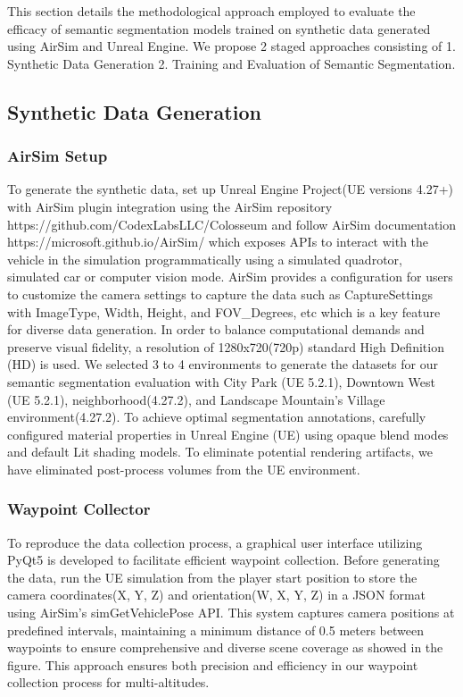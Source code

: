 \documentclass[../report.tex]{subfiles}
\begin{document}
    This section details the methodological approach employed to evaluate the efficacy of semantic segmentation models trained on synthetic data generated using AirSim and Unreal Engine. 
    We propose 2 staged approaches consisting of 1. Synthetic Data Generation 2. Training and Evaluation of Semantic Segmentation. 
    
    \subsection{Synthetic Data Generation}
    \subsubsection{AirSim Setup}
    To generate the synthetic data, set up Unreal Engine Project(UE versions 4.27+) with AirSim plugin integration using the AirSim repository https://github.com/CodexLabsLLC/Colosseum and follow AirSim documentation https://microsoft.github.io/AirSim/ which exposes APIs to interact with the vehicle in the simulation programmatically using a simulated quadrotor, simulated car or computer vision mode.
    AirSim provides a configuration for users to customize the camera settings to capture the data such as CaptureSettings with ImageType, Width, Height, and FOV\_Degrees, etc which is a key feature for diverse data generation. 
    In order to balance computational demands and preserve visual fidelity, a resolution of 1280x720(720p) standard High Definition (HD) is used. We selected 3 to 4 environments to generate the datasets for our semantic segmentation evaluation with City Park (UE 5.2.1), Downtown West (UE 5.2.1), neighborhood(4.27.2), and Landscape Mountain's Village environment(4.27.2). 
    To achieve optimal segmentation annotations, carefully configured material properties in Unreal Engine (UE) using opaque blend modes and default Lit shading models. To eliminate potential rendering artifacts, we have eliminated post-process volumes from the UE environment.
    
    \subsubsection{Waypoint Collector}
    To reproduce the data collection process, a graphical user interface utilizing PyQt5 is developed to facilitate efficient waypoint collection. Before generating the data, run the UE simulation from the player start position to store the camera coordinates(X, Y, Z) and orientation(W, X, Y, Z) in a JSON format using AirSim's simGetVehiclePose API.
    This system captures camera positions at predefined intervals, maintaining a minimum distance of 0.5 meters between waypoints to ensure comprehensive and diverse scene coverage as showed in the figure. This approach ensures both precision and efficiency in our waypoint collection process for multi-altitudes.
\end{document}
